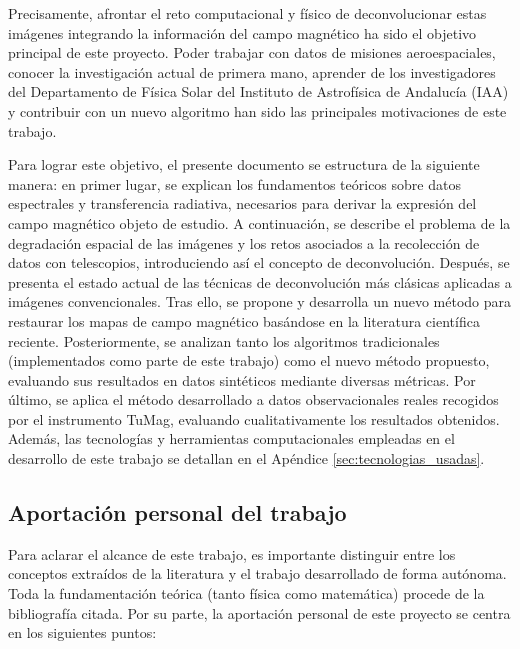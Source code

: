 Precisamente, afrontar el reto computacional y físico de deconvolucionar estas imágenes integrando la información del campo magnético ha sido el objetivo principal de este proyecto. Poder trabajar con datos de misiones aeroespaciales, conocer la investigación actual de primera mano, aprender de los investigadores del Departamento de Física Solar del Instituto de Astrofísica de Andalucía (IAA) y contribuir con un nuevo algoritmo han sido las principales motivaciones de este trabajo.

Para lograr este objetivo, el presente documento se estructura de la siguiente manera: en primer lugar, se explican los fundamentos teóricos sobre datos espectrales y transferencia radiativa, necesarios para derivar la expresión del campo magnético objeto de estudio. A continuación, se describe el problema de la degradación espacial de las imágenes y los retos asociados a la recolección de datos con telescopios, introduciendo así el concepto de deconvolución. Después, se presenta el estado actual de las técnicas de deconvolución más clásicas aplicadas a imágenes convencionales. Tras ello, se propone y desarrolla un nuevo método para restaurar los mapas de campo magnético basándose en la literatura científica reciente. Posteriormente, se analizan tanto los algoritmos tradicionales (implementados como parte de este trabajo) como el nuevo método propuesto, evaluando sus resultados en datos sintéticos mediante diversas métricas. Por último, se aplica el método desarrollado a datos observacionales reales recogidos por el instrumento TuMag, evaluando cualitativamente los resultados obtenidos. Además, las tecnologías y herramientas computacionales empleadas en el desarrollo de este trabajo se detallan en el Apéndice \ref{sec:tecnologias_usadas}.

\subsection{Aportación personal del trabajo}
Para aclarar el alcance de este trabajo, es importante distinguir entre los conceptos extraídos de la literatura y el trabajo desarrollado de forma autónoma. Toda la fundamentación teórica (tanto física como matemática) procede de la bibliografía citada. Por su parte, la aportación personal de este proyecto se centra en los siguientes puntos:

